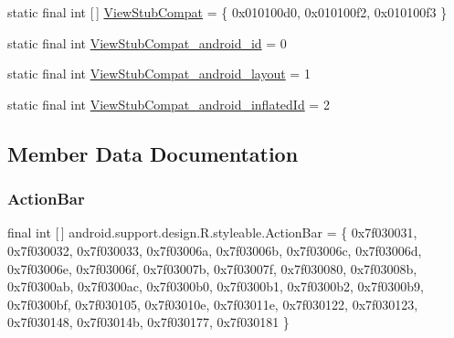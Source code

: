 \begin{DoxyCompactItemize}
\item 
static final int \mbox{[}$\,$\mbox{]} \mbox{\hyperlink{classandroid_1_1support_1_1design_1_1R_1_1styleable_a9d1ab53e5b97dd9ed9bd6109532344ef}{View\+Stub\+Compat}} = \{ 0x010100d0, 0x010100f2, 0x010100f3 \}
\item 
static final int \mbox{\hyperlink{classandroid_1_1support_1_1design_1_1R_1_1styleable_a28232eb26205dd7d1926081f2535ab1e}{View\+Stub\+Compat\+\_\+android\+\_\+id}} = 0
\item 
static final int \mbox{\hyperlink{classandroid_1_1support_1_1design_1_1R_1_1styleable_ae3ebfa5defbb371675ed847339ac19af}{View\+Stub\+Compat\+\_\+android\+\_\+layout}} = 1
\item 
static final int \mbox{\hyperlink{classandroid_1_1support_1_1design_1_1R_1_1styleable_a72e44c4ee2da3d0d5ad9c3780f98d454}{View\+Stub\+Compat\+\_\+android\+\_\+inflated\+Id}} = 2
\end{DoxyCompactItemize}


\subsection{Member Data Documentation}
\mbox{\label{classandroid_1_1support_1_1design_1_1R_1_1styleable_ab795220a96557d11f8c21359b95bed82}} 
\subsubsection{\texorpdfstring{Action\+Bar}{ActionBar}}
{\footnotesize\ttfamily final int \mbox{[}$\,$\mbox{]} android.\+support.\+design.\+R.\+styleable.\+Action\+Bar = \{ 0x7f030031, 0x7f030032, 0x7f030033, 0x7f03006a, 0x7f03006b, 0x7f03006c, 0x7f03006d, 0x7f03006e, 0x7f03006f, 0x7f03007b, 0x7f03007f, 0x7f030080, 0x7f03008b, 0x7f0300ab, 0x7f0300ac, 0x7f0300b0, 0x7f0300b1, 0x7f0300b2, 0x7f0300b9, 0x7f0300bf, 0x7f030105, 0x7f03010e, 0x7f03011e, 0x7f030122, 0x7f030123, 0x7f030148, 0x7f03014b, 0x7f030177, 0x7f030181 \}\hspace{0.3cm}{\ttfamily [static]}}

\mbox{\label{classandroid_1_1support_1_1design_1_1R_1_1styleable_a2d07ba50bce7e11b3a849eefb51eb7ea}} 
